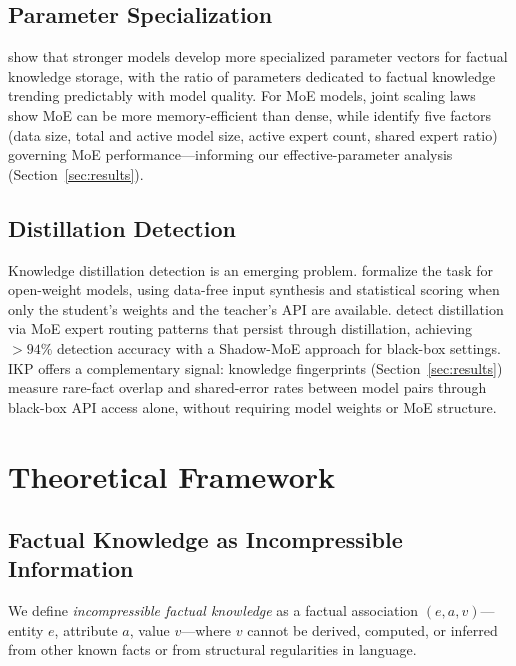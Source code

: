\documentclass[11pt]{article}
\begin{document}
\subsection{Parameter Specialization}

\citet{hong2025} show that stronger models develop more specialized parameter vectors for factual knowledge storage, with the ratio of parameters dedicated to factual knowledge trending predictably with model quality. For MoE models, joint scaling laws~\citep{ludziejewski2025moe} show MoE can be more memory-efficient than dense, while \citet{zhao2025moescaling} identify five factors (data size, total and active model size, active expert count, shared expert ratio) governing MoE performance---informing our effective-parameter analysis (Section~\ref{sec:results}).

\subsection{Distillation Detection}

Knowledge distillation detection is an emerging problem. \citet{shi2025kddistillation} formalize the task for open-weight models, using data-free input synthesis and statistical scoring when only the student's weights and the teacher's API are available. \citet{li2025experts} detect distillation via MoE expert routing patterns that persist through distillation, achieving $>94\%$ detection accuracy with a Shadow-MoE approach for black-box settings. IKP offers a complementary signal: knowledge fingerprints (Section~\ref{sec:results}) measure rare-fact overlap and shared-error rates between model pairs through black-box API access alone, without requiring model weights or MoE structure.

\section{Theoretical Framework}
\label{sec:theory}

\subsection{Factual Knowledge as Incompressible Information}

We define \emph{incompressible factual knowledge} as a factual association $(e, a, v)$---entity $e$, attribute $a$, value $v$---where $v$ cannot be derived, computed, or inferred from other known facts or from structural regularities in language.
\end{document}
